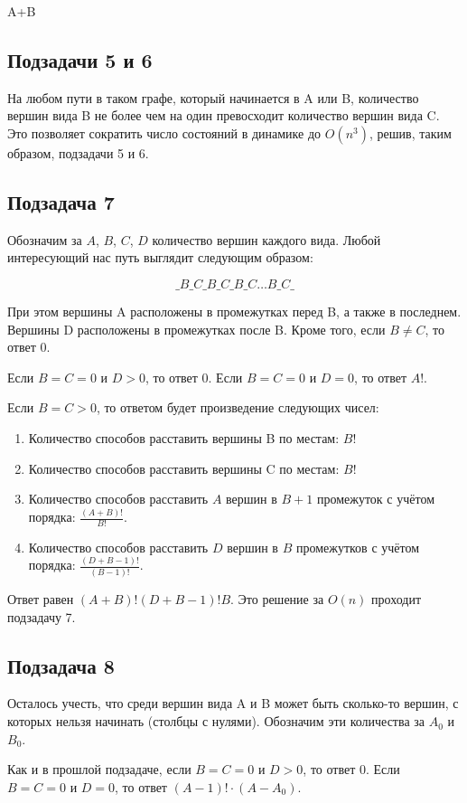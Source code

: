 \begin{tutorial}{A+B}
\subsection*{Подзадачи 5 и 6}
На любом пути в таком графе, который начинается в A или B, количество вершин вида B не более чем на один превосходит количество вершин вида C. Это позволяет сократить число состояний в динамике до $O(n^3)$, решив, таким образом, подзадачи 5 и 6.

\subsection*{Подзадача 7}
Обозначим за $A$, $B$, $C$, $D$ количество вершин каждого вида. Любой интересующий нас путь выглядит следующим образом:

$$\_ B \_ C \_ B \_ C \_ B \_ C \dots B \_ C \_$$

При этом вершины A расположены в промежутках перед B, а также в последнем. Вершины D расположены в промежутках после B. Кроме того, если $B \neq C$, то ответ 0.

Если $B=C=0$ и $D>0$, то ответ 0. Если $B=C=0$ и $D=0$, то ответ $A!$.

Если $B=C>0$, то ответом будет произведение следующих чисел:
\begin{enumerate}
\item Количество способов расставить вершины B по местам: $B!$
\item Количество способов расставить вершины C по местам: $B!$
\item Количество способов расставить $A$ вершин в $B+1$ промежуток с учётом порядка: $\frac{(A+B)!}{B!}$.
\item Количество способов расставить $D$ вершин в $B$ промежутков с учётом порядка: $\frac{(D+B-1)!}{(B-1)!}$.
\end{enumerate}

Ответ равен $(A+B)!(D+B-1)!B$. Это решение за $O(n)$ проходит подзадачу 7.

\subsection*{Подзадача 8}
Осталось учесть, что среди вершин вида A и B может быть сколько-то вершин, с которых нельзя начинать (столбцы с нулями). Обозначим эти количества за $A_0$ и $B_0$.

Как и в прошлой подзадаче, если $B=C=0$ и $D>0$, то ответ 0. Если $B=C=0$ и $D=0$, то ответ $(A-1)! \cdot (A-A_0)$.


\end{tutorial}
